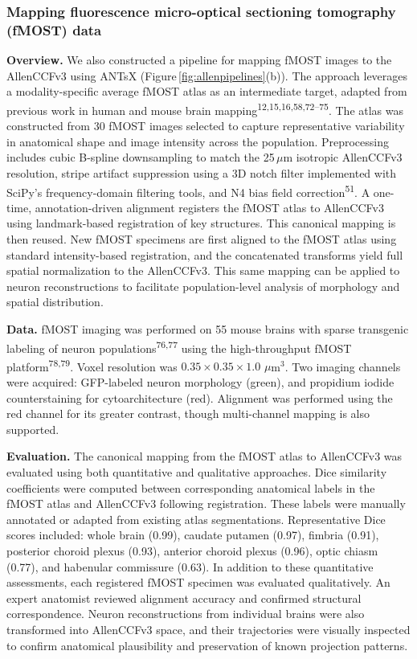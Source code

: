 \documentclass[
  12pt,
]{article}
\begin{document}
\subsubsection{Mapping fluorescence micro-optical sectioning tomography
(fMOST)
data}\label{mapping-fluorescence-micro-optical-sectioning-tomography-fmost-data}

\textbf{Overview.} We also constructed a pipeline for mapping fMOST
images to the AllenCCFv3 using ANTsX
(Figure\,\ref{fig:allenpipelines}(b)). The approach leverages a
modality-specific average fMOST atlas as an intermediate target, adapted
from previous work in human and mouse brain
mapping\textsuperscript{12,15,16,58,72--75}. The atlas was constructed
from 30 fMOST images selected to capture representative variability in
anatomical shape and image intensity across the population.
Preprocessing includes cubic B-spline downsampling to match the
25\,\(\mu\)m isotropic AllenCCFv3 resolution, stripe artifact
suppression using a 3D notch filter implemented with SciPy's
frequency-domain filtering tools, and N4 bias field
correction\textsuperscript{51}. A one-time, annotation-driven alignment
registers the fMOST atlas to AllenCCFv3 using landmark-based
registration of key structures. This canonical mapping is then reused.
New fMOST specimens are first aligned to the fMOST atlas using standard
intensity-based registration, and the concatenated transforms yield full
spatial normalization to the AllenCCFv3. This same mapping can be
applied to neuron reconstructions to facilitate population-level
analysis of morphology and spatial distribution.

\textbf{Data.} fMOST imaging was performed on 55 mouse brains with
sparse transgenic labeling of neuron populations\textsuperscript{76,77}
using the high-throughput fMOST platform\textsuperscript{78,79}. Voxel
resolution was \(0.35\times 0.35\times 1.0\) \(\mu\)m\(^3\). Two imaging
channels were acquired: GFP-labeled neuron morphology (green), and
propidium iodide counterstaining for cytoarchitecture (red). Alignment
was performed using the red channel for its greater contrast, though
multi-channel mapping is also supported.

\textbf{Evaluation.} The canonical mapping from the fMOST atlas to
AllenCCFv3 was evaluated using both quantitative and qualitative
approaches. Dice similarity coefficients were computed between
corresponding anatomical labels in the fMOST atlas and AllenCCFv3
following registration. These labels were manually annotated or adapted
from existing atlas segmentations. Representative Dice scores included:
whole brain (0.99), caudate putamen (0.97), fimbria (0.91), posterior
choroid plexus (0.93), anterior choroid plexus (0.96), optic chiasm
(0.77), and habenular commissure (0.63). In addition to these
quantitative assessments, each registered fMOST specimen was evaluated
qualitatively. An expert anatomist reviewed alignment accuracy and
confirmed structural correspondence. Neuron reconstructions from
individual brains were also transformed into AllenCCFv3 space, and their
trajectories were visually inspected to confirm anatomical plausibility
and preservation of known projection patterns.
\end{document}
